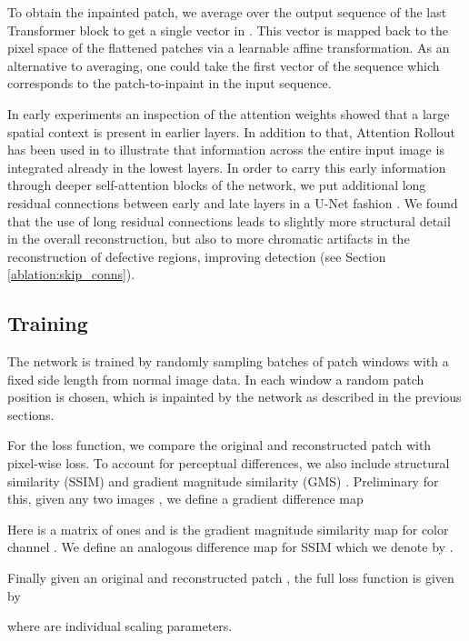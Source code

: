 \documentclass[final,5p,times,twocolumn]{elsarticle}
\begin{document}
	To obtain the inpainted patch, we average over the output sequence of the last Transformer block to get a single vector in . This vector is mapped back to the pixel space of the flattened patches  via a learnable affine transformation. As an alternative to averaging, one could take the first vector of the sequence which corresponds to the patch-to-inpaint in the input sequence.
	
	In early experiments an inspection of the attention weights showed that a large spatial context is present in earlier layers. In addition to that, Attention Rollout \cite{attentionRollout} has been used in \cite{dosovitskiy2020} to illustrate that information across the entire input image is integrated already in the lowest layers. In order to carry this early information through deeper self-attention blocks of the network, we put additional long residual connections between early and late layers in a U-Net fashion \cite{10.1007/978-3-319-24574-4_28}. We found that the use of long residual connections leads to slightly more structural detail in the overall reconstruction, but also to more chromatic artifacts in the reconstruction of defective regions, improving detection (see Section \ref{ablation:skip_conns}). 
	
	\subsection{Training}
	
	The network is trained by randomly sampling batches of patch windows with a fixed side length  from normal image data. In each window a random patch position  is chosen, which is inpainted by the network as described in the previous sections. 
	
	For the loss function, we compare the original and reconstructed patch with pixel-wise  loss. To account for perceptual differences, we also include structural similarity (SSIM) \cite{Wang2004ssim} and gradient magnitude similarity (GMS) \cite{10.1109/TIP.2013.2293423}.
	Preliminary for this, given any two images , we define a gradient difference map
	
	Here  is a matrix of ones and  is the gradient magnitude similarity map for color channel . We define an analogous difference map for SSIM which we denote by . 
	
	Finally given an original and reconstructed patch , the full loss function  is given by
	
	where  are individual scaling parameters. 
	
\end{document}
